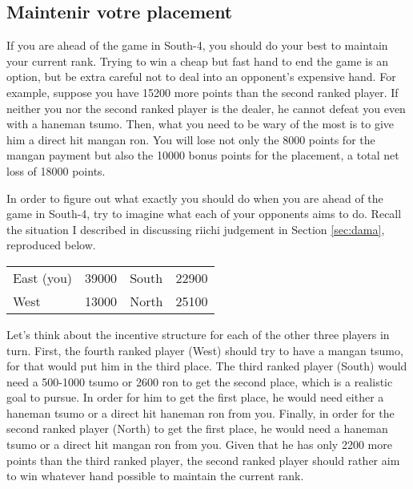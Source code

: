 \subsection*{Maintenir votre placement}
If you are ahead of the game in South-4, you should do your best to maintain your current rank. Trying to win a cheap but fast hand to end the game is an option, but be extra careful not to deal into an opponent's expensive hand. For example, suppose you have 15200 more points than the second ranked player. If neither you nor the second ranked player is the dealer, he cannot defeat you even with a {\jap haneman tsumo}. Then, what you need to be wary of the most is to give him a direct hit {\jap mangan ron}. You will lose not only the 8000 points for the {\jap mangan} payment but also the 10000 bonus points for the placement, a total net loss of 18000 points.

\bigskip
In order to figure out what exactly you should do when you are ahead of the game in South-4, try to imagine what each of your opponents aims to do. Recall the situation I described in discussing riichi judgement in Section \ref{sec:dama}, reproduced below.

\begin{table}[h]
\begin{center}
\begin{tabular}{l r l r}
East (you) & 39000 & South & 22900\\
West & 13000 & North & 25100\\
\end{tabular}
\end{center}
\vspace{-10pt}
\end{table}

\bigskip
Let's think about the incentive structure for each of the other three players in turn. First, the fourth ranked player (West) should try to have a {\jap mangan tsumo}, for that would put him in the third place. The third ranked player (South) would need a 500-1000 {\jap tsumo} or 2600 {\jap ron} to get the second place, which is a realistic goal to pursue. In order for him to get the first place, he would need either a {\jap haneman tsumo} or a direct hit {\jap haneman ron} from you. Finally, in order for the second ranked player (North) to get the first place, he would need a {\jap haneman tsumo} or a direct hit {\jap mangan ron} from you. Given that he has only 2200 more points than the third ranked player, the second ranked player should rather aim to win whatever hand possible to maintain the current rank. 

